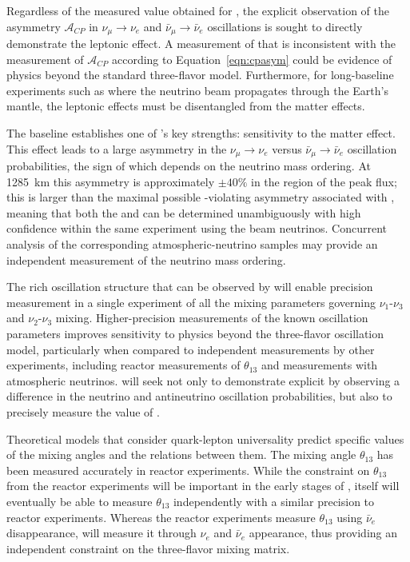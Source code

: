 Regardless of the measured value obtained for \deltacp, the explicit
observation of the asymmetry $\mathcal{A}_{CP}$ in $\nu_{\mu}
\rightarrow \nu_e$ and $\bar{\nu}_{\mu} \rightarrow
\bar{\nu}_e$ oscillations is sought to directly demonstrate the
leptonic  effect.  A measurement of \deltacp that is
inconsistent with the measurement of $\mathcal{A}_{CP}$ according to
Equation~\ref{eqn:cpasym} could be evidence of physics beyond the
standard three-flavor model.  Furthermore, for long-baseline
experiments such as  where the neutrino beam propagates through
the Earth's mantle, the leptonic  effects must be
disentangled from the matter effects.

The  baseline establishes one of 's key strengths: sensitivity to the matter effect. This effect leads to a large asymmetry in the $\nu_\mu\to \nu_e$ versus $\bar{\nu}_\mu \to \bar{\nu}_e$ oscillation probabilities, the sign of which depends on the neutrino mass ordering.  At 1285~km this asymmetry is approximately $\pm 40\%$ in the region of the peak flux; this is larger than the maximal possible -violating asymmetry associated with \deltacp, meaning that both the  and \deltacp can be determined
unambiguously with high confidence within the same experiment using the beam neutrinos. Concurrent analysis of the corresponding atmospheric-neutrino samples may provide an independent measurement of the neutrino mass ordering.

The rich oscillation structure that can be observed by  will enable precision measurement  in a single experiment of all the mixing parameters governing $\nu_1$-$\nu_3$ and $\nu_2$-$\nu_3$ mixing. Higher-precision measurements of the known oscillation parameters improves sensitivity to physics beyond the three-flavor oscillation model, particularly when compared to independent measurements by other experiments, including reactor measurements of $\theta_{13}$ and
measurements with atmospheric neutrinos.  will seek not only to demonstrate explicit  by observing a difference in the neutrino and antineutrino oscillation probabilities, but also to precisely measure the value of \deltacp. 

 Theoretical models that consider quark-lepton universality predict specific values of the mixing angles and the relations between them. The mixing angle $\theta_{13}$ has been measured accurately in reactor experiments. While the constraint on $\theta_{13}$ from the reactor experiments will be important in the
early stages of , 
 itself will eventually be able to measure
$\theta_{13}$ independently with a similar precision to reactor experiments. 
Whereas the reactor experiments measure $\theta_{13}$ using $\bar{\nu}_e$ disappearance,  will measure it through $\nu_e$ and $\bar{\nu}_e$ appearance, thus providing an independent constraint on
the three-flavor mixing matrix.   

